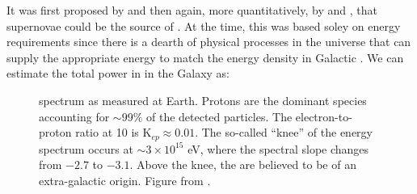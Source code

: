 It was first proposed by \cite{Baade34} and then again, more quantitatively, by \cite{Ginzburg64} and \cite{Hayakawa69}, that supernovae could be the source of \crs{}. At the time, this was based soley on energy requirements since  there is a dearth of physical processes in the universe that can supply the appropriate energy to match the energy density in Galactic \crs{}. We can estimate the total power in \crs{} in the Galaxy as:

\begin{figure}[h!]%
	\centering
	\caption[CR spectrum as measured at Earth]{\cray{} spectrum as measured at Earth. Protons are the dominant species accounting for  $\sim 99\%$ of the detected particles. The electron-to-proton ratio at 10\gev{} is  K$_{ep} \approx 0.01$. The so-called ``knee'' of the \cray{} energy spectrum occurs at $\sim 3\times 10^{15}$ eV, where the \pl{} spectral slope changes from $-2.7$ to $-3.1$. Above the knee, the \crs{} are believed to be of an extra-galactic origin. Figure from \cite{Blasi13}.
	\label{fig:CRspec}} 
\end{figure}

